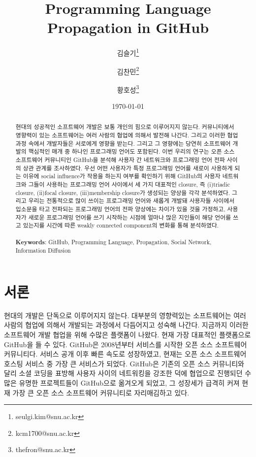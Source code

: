 \documentclass[10pt, a4paper, titlepage]{article}
\title{
	Programming Language Propagation in GitHub
}
\author[ ]{김슬기\thanks{seulgi.kim@snu.ac.kr}}
\author[ ]{김찬민\thanks{kcm1700@snu.ac.kr}}
\author[ ]{황호성\thanks{thefron@snu.ac.kr}}
\affil[ ]{서울대학교 컴퓨터공학부}
\date{\today}
\begin{document}
\maketitle


\begin{abstract}
현대의 성공적인 소프트웨어 개발은 보통 개인의 힘으로 이루어지지 않는다. 커뮤니티에서 영향력이 있는 소프트웨어는 여러 사람의 협업에 의해서 발전해 나간다. 그리고 이러한 협업 과정 속에서 개발자들은 서로에게 영향을 받는다. 그리고 그 영향에는 당연히 소프트웨어 개발의 핵심적인 매개 중 하나인 프로그래밍 언어도 포함된다. 이번 우리의 연구는 오픈 소스 소프트웨어 커뮤니티인 GitHub을 분석해 사용자 간 네트워크와 프로그래밍 언어 전파 사이의 상관 관계를  조사하였다.
우선 어떤 사용자가 특정 프로그래밍 언어를 새로이 사용하게 되는 이유에 social influence가 작용을 하는지 여부를 확인하기 위해 GitHub의 사용자 네트워크와 그들이 사용하는 프로그래밍 언어 사이에서 세 가지 대표적인 closure, 즉 (i)triadic closure, (ii)focal closure, (iii)membership closure가 생성되는 양상을 각각 분석하였다.
그리고 우리는 전통적으로 많이 쓰이는 프로그래밍 언어와 새롭게 개발돼 사용자들 사이에서 입소문을 타고 전파되는 프로그래밍 언어의 전파 양상에는 차이가 있을 것을 가정하고, 사용자가 새로운 프로그래밍 언어를 쓰기 시작하는 시점에 얼마나 많은 지인들이 해당 언어를 쓰고 있는지를 시간에 따른 weakly connected component의 변화를 통해 분석하였다.
\\ \\
{\bf Keywords}: GitHub, Programming Language, Propagation, Social Network, Information Diffusion
\end{abstract}

\tableofcontents %

\newpage


\section{서론}
현대의 개발은 단독으로 이루어지지 않는다. 대부분의 영향력있는 소프트웨어는 여러 사람의 협업에 의해서 개발되는 과정에서 다듬어지고 성숙해 나간다. 지금까지 이러한 소프트웨어 개발 협업을 위해 수많은 플랫폼이 나왔다. 현재 가장 대표적인 플랫폼으로 GitHub을 들 수 있다. GitHub은 2008년부터 서비스를 시작한 오픈 소스 소프트웨어 커뮤니티다\cite{r1}. 서비스 공개 이후 빠른 속도로 성장하였고, 현재는 오픈 소스 소프트웨어 호스팅 서비스 중 가장 큰 서비스가 되었다. GitHub은 기존의 오픈 소스 커뮤니티와 달리 소셜 코딩을 표방해 사용자 사이의 네트워킹을 강조한 덕에 협업으로 진행되던 수많은 유명한 프로젝트들이 GitHub으로 옮겨오게 되었고, 그 성장세가 급격히 커져 현재 가장 큰 오픈 소스 소프트웨어 커뮤니티로 자리매김하고 있다.
\end{document}
